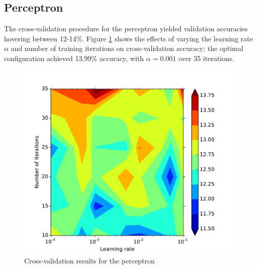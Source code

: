 \documentclass{acm_proc_article-sp}
\begin{document}
\subsection{Perceptron}

The cross-validation procedure for the perceptron yielded validation accuracies hovering between 12-14\%. Figure \ref{fig:perceptron-crossval} shows the effects of varying the learning rate $\alpha$ and number of training iterations on cross-validation accuracy; the optimal configuration achieved 13.99\% accuracy, with $\alpha = 0.001$ over 35 iterations. 
\begin{figure}[h!]
\includegraphics[width=\linewidth]{perceptron_crossval.pdf}
		\caption{Cross-validation results for the perceptron}
		\label{fig:perceptron-crossval}
\end{figure}
\end{document}

